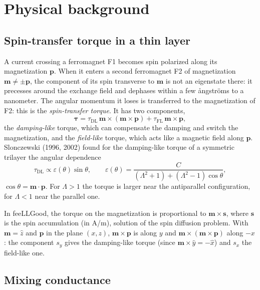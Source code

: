 \documentclass[11pt,a4paper]{article}
\newcommand{\vm}{\bm{m}}
\newcommand{\vp}{\bm{p}}
\newcommand{\vs}{\bm{s}}
\begin{document}
\section{Physical background}

\subsection{Spin-transfer torque in a thin layer}

A current crossing a ferromagnet F1 becomes spin polarized along its
magnetization $\vp$. When it enters a second ferromagnet F2 of
magnetization $\vm\neq\pm\vp$, the component of its spin transverse to
$\vm$ is not an eigenstate there: it precesses around the exchange field
and dephases within a few ångströms to a nanometer. The angular momentum
it loses is transferred to the magnetization of F2: this is the
\emph{spin-transfer torque}. It has two components,
\begin{equation}
  \bm{\tau} = \tau_{\mathrm{DL}}\,\vm\times(\vm\times\vp)
            + \tau_{\mathrm{FL}}\,\vm\times\vp ,
\end{equation}
the \emph{damping-like} torque, which can compensate the damping and
switch the magnetization, and the \emph{field-like} torque, which acts like
a magnetic field along $\vp$. Slonczewski (1996, 2002) found for the
damping-like torque of a symmetric trilayer the angular dependence
\begin{equation}
  \tau_{\mathrm{DL}} \propto \varepsilon(\theta)\sin\theta,
  \qquad
  \varepsilon(\theta) = \frac{C}{(\Lambda^2+1)+(\Lambda^2-1)\cos\theta},
  \label{eq:slonczewski}
\end{equation}
$\cos\theta = \vm\cdot\vp$. For $\Lambda > 1$ the torque is larger near
the antiparallel configuration, for $\Lambda < 1$ near the parallel one.

In feeLLGood, the torque on the magnetization is proportional to
$\vm\times\vs$, where $\vs$ is the spin accumulation (in A/m), solution of
the spin diffusion problem. With $\vm = \hat z$ and $\vp$ in the plane
$(x,z)$, $\vm\times\vp$ is along $y$ and $\vm\times(\vm\times\vp)$ along
$-x$: the component $s_y$ gives the damping-like torque (since
$\vm\times\hat y = -\hat x$) and $s_x$ the field-like one.

\subsection{Mixing conductance}
\end{document}
